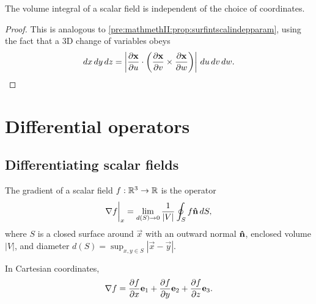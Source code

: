 \documentclass[10pt, a4paper]{article}
\begin{document}
\begin{proposition}
    The volume integral of a scalar field is independent of the choice of coordinates.

    \begin{proof}
        This is analogous to \autoref{pre:mathmethII:prop:surfintscalindepparam},
        using the fact that a $3$D change of variables obeys
        \[
        dx\,dy\,dz = \left|\pd[\vec{x}]{u} \cdot \left(\pd[\vec{x}]{v} \times \pd[\vec{x}]{w}\right)\right|\,du\,dv\,dw.
        \]
    \end{proof}
\end{proposition}

\newpage

\section{Differential operators}

\subsection{Differentiating scalar fields}

The gradient of a scalar field $f : \R ^ 3 \to \R$ is the operator
\[
\bnabla f \biggr|_{x} = \lim_{d(S) \to 0}\frac{1}{|V|}\oint_{S}f\hvec{n}\,dS,
\]
where $S$ is a closed surface around $\vec{x}$ with an outward normal $\hvec{n}$,
enclosed volume $|V|$,
and diameter $d(S) = \sup_{x, y \in S}|\vec{x} - \vec{y}|$.

\begin{proposition}\label{pre:mathmethII:prop:gradincart}
    In Cartesian coordinates,
    \[
    \bnabla f = \pd[f]{x}\vec{e}_1 + \pd[f]{y}\vec{e}_2 + \pd[f]{z}\vec{e}_3.
    \]
\end{proposition}
\end{document}
